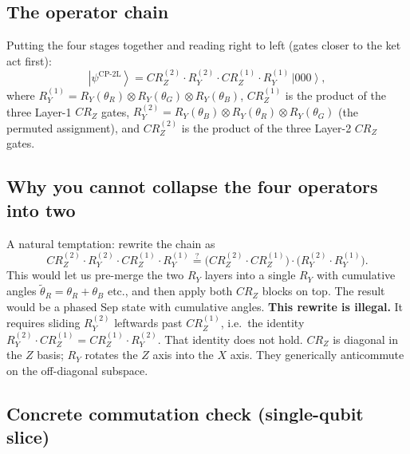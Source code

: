 \documentclass[11pt]{article}
\newcommand{\ket}[1]{\left| #1 \right\rangle}
\begin{document}
\subsection{The operator chain}

Putting the four stages together and reading right to left (gates closer to the ket act first):
\[
\boxed{\,\ket{\psi^\text{CP-2L}} = CR_Z^{(2)} \cdot R_Y^{(2)} \cdot CR_Z^{(1)} \cdot R_Y^{(1)} \, \ket{000},\,}
\]
where $R_Y^{(1)} = R_Y(\theta_R) \otimes R_Y(\theta_G) \otimes R_Y(\theta_B)$, $CR_Z^{(1)}$ is the product of the three Layer-1 $CR_Z$ gates, $R_Y^{(2)} = R_Y(\theta_B) \otimes R_Y(\theta_R) \otimes R_Y(\theta_G)$ (the permuted assignment), and $CR_Z^{(2)}$ is the product of the three Layer-2 $CR_Z$ gates.

\subsection{Why you cannot collapse the four operators into two}

A natural temptation: rewrite the chain as
\[
CR_Z^{(2)} \cdot R_Y^{(2)} \cdot CR_Z^{(1)} \cdot R_Y^{(1)} \stackrel{?}{=} \bigl(CR_Z^{(2)} \cdot CR_Z^{(1)}\bigr) \cdot \bigl(R_Y^{(2)} \cdot R_Y^{(1)}\bigr).
\]
This would let us pre-merge the two $R_Y$ layers into a single $R_Y$ with cumulative angles $\tilde\theta_R = \theta_R + \theta_B$ etc., and then apply both $CR_Z$ blocks on top. The result would be a phased Sep state with cumulative angles. \textbf{This rewrite is illegal.} It requires sliding $R_Y^{(2)}$ leftwards past $CR_Z^{(1)}$, i.e.\ the identity $R_Y^{(2)} \cdot CR_Z^{(1)} = CR_Z^{(1)} \cdot R_Y^{(2)}$. That identity does not hold. $CR_Z$ is diagonal in the $Z$ basis; $R_Y$ rotates the $Z$ axis into the $X$ axis. They generically anticommute on the off-diagonal subspace.

\subsection{Concrete commutation check (single-qubit slice)}
\end{document}

